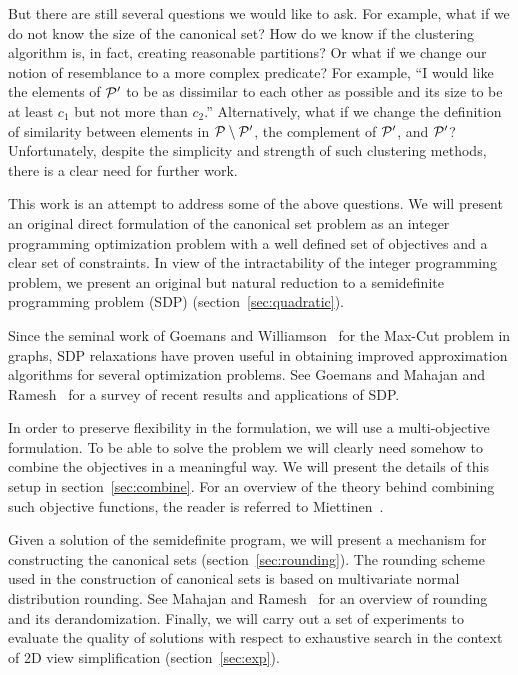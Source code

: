 \documentclass{ieee}
\def\P{{\cal P}}
\begin{document}
But there are still several questions we would like to ask. For
example, what if we do not know the size of the canonical set? How do
we know if the clustering algorithm is, in fact, creating reasonable
partitions? Or what if we change our notion of resemblance to a more
complex predicate? For example, ``I would like the elements of $\P'$
to be as dissimilar to each other as possible and its size to be at
least $c_1$ but not more than $c_2$.'' Alternatively, what if we
change the definition of similarity between elements in
$\P\setminus\P'$, the complement of $\P'$, and $\P'$?  Unfortunately,
despite the simplicity and strength of such clustering methods, there
is a clear need for further work.

This work is an attempt to address some of the above questions.  We
will present an original direct formulation of the canonical set
problem as an integer programming optimization problem with a well
defined set of objectives and a clear set of constraints.  In view of
the intractability of the integer programming problem, we present an
original but natural reduction to a semidefinite programming problem
(SDP) (section~\ref{sec:quadratic}).

Since the seminal work of Goemans and Williamson~\cite{GW94} for the
{\sc Max-Cut} problem in graphs, SDP relaxations have proven useful in
obtaining improved approximation algorithms for several optimization
problems. See Goemans \cite{goemans97semidefinite} and Mahajan and
Ramesh~\cite{mahajan99derandomizing} for a survey of recent results
and applications of SDP.

In order to preserve flexibility in the formulation, we will use a
multi-objective formulation.  To be able to solve the problem we will
clearly need somehow to combine the objectives in a meaningful way. We
will present the details of this setup in
section~\ref{sec:combine}. For an overview of the theory behind
combining such objective functions, the reader is referred to
Miettinen~\cite{nonlin-multiobj-opt}.

Given a solution of the semidefinite program, we will present a
mechanism for constructing the canonical sets
(section~\ref{sec:rounding}).  The rounding scheme used in the
construction of canonical sets is based on multivariate normal
distribution rounding. See Mahajan and
Ramesh~\cite{nonlin-multiobj-opt} for an overview of rounding and its
derandomization.  Finally, we will carry out a set of experiments to
evaluate the quality of solutions with respect to exhaustive search in
the context of 2D view simplification (section~\ref{sec:exp}).
\vspace{-0.1in}
\end{document}
